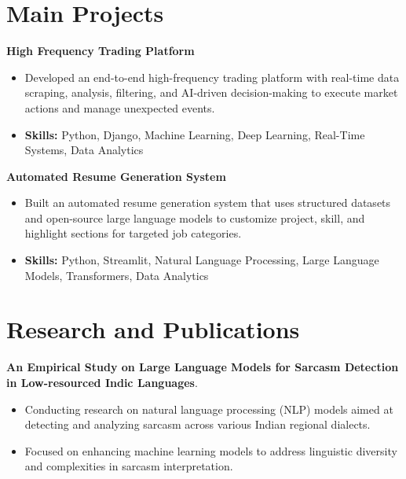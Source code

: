 \documentclass[a4paper,11pt]{article}
\begin{document}
\section{\textbf{Main Projects}}

\vspace{1mm}
  \textbf{High Frequency Trading Platform  }
\vspace{-1.5mm} %
\begin{itemize}
  \item Developed an end-to-end high-frequency trading platform with real-time data scraping, analysis, filtering, and AI-driven decision-making to execute market actions and manage unexpected events.
\vspace{-3mm}
  \item \textbf{Skills:} Python, Django, Machine Learning, Deep Learning, Real-Time Systems, Data Analytics
\end{itemize}


\vspace{1mm}
   \textbf{Automated Resume Generation System }
\vspace{-1.5mm} %
\begin{itemize}
  \item Built an automated resume generation system that uses structured datasets and open-source large language models to customize project, skill, and highlight sections for targeted job categories.
\vspace{-3mm}
  \item \textbf{Skills:} Python, Streamlit, Natural Language Processing, Large Language Models, Transformers, Data Analytics
\end{itemize}



\section{\textbf{Research and Publications} \hfill }
\vspace{1mm}
  \textbf{An Empirical Study on Large Language Models for Sarcasm Detection in Low-resourced Indic Languages}.
\vspace{-1mm} %
\begin{itemize}
  \item Conducting research on natural language processing (NLP) models aimed at detecting and analyzing sarcasm across various Indian regional dialects.
\vspace{-3mm}
  \item Focused on enhancing machine learning models to address linguistic diversity and complexities in sarcasm interpretation.
\end{itemize}
\end{document}

